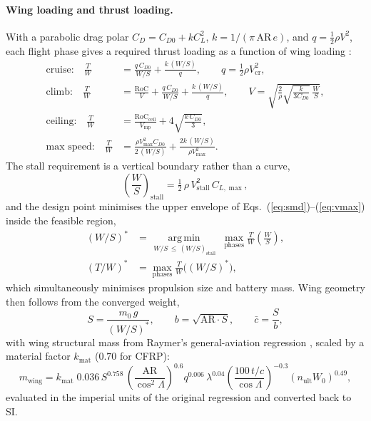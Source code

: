 \paragraph{Wing loading and thrust loading.} With a parabolic drag
polar $C_D=C_{D0}+kC_L^{2}$, $k=1/(\pi\,\mathrm{AR}\,e)$, and
$q=\tfrac{1}{2}\rho V^{2}$, each flight phase gives a required thrust
loading as a function of wing loading \citep{gudmundsson2014,sadraey2013}:
\begin{align}
\text{cruise:}\quad
  \frac{T}{W} &= \frac{q\,C_{D0}}{W/S} + \frac{k\,(W/S)}{q},
  \qquad q=\tfrac{1}{2}\rho V_{\mathrm{cr}}^{2},
  \label{eq:smd}\\
\text{climb:}\quad
  \frac{T}{W} &= \frac{\mathrm{RoC}}{V} + \frac{q\,C_{D0}}{W/S}
                 + \frac{k\,(W/S)}{q},
  \qquad V=\sqrt{\frac{2}{\rho}\sqrt{\frac{k}{3C_{D0}}}\,\frac{W}{S}},
  \label{eq:climb}\\
\text{ceiling:}\quad
  \frac{T}{W} &= \frac{\mathrm{RoC}_{\mathrm{ceil}}}{V_{\mathrm{mp}}}
                 + 4\sqrt{\frac{k\,C_{D0}}{3}},
  \label{eq:ceiling}\\
\text{max speed:}\quad
  \frac{T}{W} &= \frac{\rho V_{\max}^{2}C_{D0}}{2\,(W/S)}
                 + \frac{2k\,(W/S)}{\rho V_{\max}^{2}} .
  \label{eq:vmax}
\end{align}
The stall requirement is a vertical boundary rather than a curve,
\begin{equation}
\left(\frac{W}{S}\right)_{\mathrm{stall}}
  = \tfrac{1}{2}\,\rho\,V_{\mathrm{stall}}^{2}\,C_{L,\max},
\label{eq:stall}
\end{equation}
and the design point minimises the upper envelope of
Eqs.~(\ref{eq:smd})--(\ref{eq:vmax}) inside the feasible region,
\begin{equation}
\begin{aligned}
(W/S)^{\ast}
  &= \operatorname*{arg\,min}_{\,W/S\,\le\,(W/S)_{\mathrm{stall}}}\;
     \max_{\text{phases}} \frac{T}{W}\!\left(\frac{W}{S}\right),\\[2pt]
(T/W)^{\ast}
  &= \max_{\text{phases}}\frac{T}{W}\Big((W/S)^{\ast}\Big),
\end{aligned}
\label{eq:designpoint}
\end{equation}
which simultaneously minimises propulsion size and battery mass. Wing
geometry then follows from the converged weight,
\begin{equation}
S = \frac{m_0\,g}{(W/S)^{\ast}},
\qquad
b = \sqrt{\mathrm{AR}\cdot S},
\qquad
\bar{c} = \frac{S}{b},
\label{eq:winggeom}
\end{equation}
with wing structural mass from Raymer's general-aviation regression
\citep{raymer2018}, scaled by a material factor
$k_{\mathrm{mat}}$ ($0.70$ for CFRP):
\begin{equation}
m_{\mathrm{wing}} = k_{\mathrm{mat}}\;0.036\,
  S^{0.758}\,
  \left(\frac{\mathrm{AR}}{\cos^{2}\Lambda}\right)^{0.6}
  q^{0.006}\,\lambda^{0.04}
  \left(\frac{100\,t/c}{\cos\Lambda}\right)^{-0.3}
  \left(n_{\mathrm{ult}}W_0\right)^{0.49},
\label{eq:raymer}
\end{equation}
evaluated in the imperial units of the original regression and
converted back to SI.

